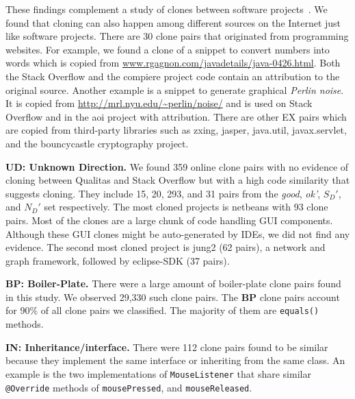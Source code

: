 \documentclass[sigconf,review, anonymous]{acmart}
\begin{document}
These findings complement a study of clones between software
projects~\cite{Svajlenko2014}. We found that cloning can also
happen among different sources on the Internet just like software
projects. There are 30 clone pairs that originated from programming
websites. For example, we found a clone of a snippet to convert
numbers into words which is copied from
\url{www.rgagnon.com/javadetails/java-0426.html}. Both the Stack
Overflow and the \textsf{compiere} project code contain an
attribution to the original source. Another example is a snippet
to generate graphical \textit{Perlin noise}. It is copied from
\url{http://mrl.nyu.edu/~perlin/noise/} and is used on Stack
Overflow and in the \textsf{aoi} project with
attribution.
There are other EX pairs which are copied from third-party
libraries such as \textsf{zxing}, \textsf{jasper}, \textsf{java.util},
\textsf{javax.servlet}, and the \textsf{bouncycastle} cryptography
project.

\textbf{UD: Unknown Direction.} We found 359 online clone pairs with
no evidence of cloning between Qualitas and Stack Overflow but with a
high code similarity that suggests cloning. They include 15, 20, 293,
and 31 pairs from the \textit{good}, \textit{ok'}, $S_D'$, and $N_D'$
set respectively. The most cloned projects is \textsf{netbeans} with
93 clone pairs. Most of the clones are a large chunk of code handling
GUI components. Although these GUI clones might be auto-generated by
IDEs, we did not find any evidence. The second most cloned project is
\textsf{jung2} (62 pairs), a network and graph framework, followed by
\textsf{eclipse-SDK} (37 pairs).

\textbf{BP: Boiler-Plate.} There were a large amount of boiler-plate
clone pairs found in this study. %
We observed 29,330 such clone pairs. The \textbf{BP} clone pairs account for
90\% of all clone pairs we classified. The majority of them are
{\small{\texttt{equals()}}} methods.

\textbf{IN: Inheritance/interface.} There were 112 clone pairs found
to be similar because they implement the same interface or inheriting
from the same class. An example is the two implementations of
{\small{\texttt{MouseListener}}} that share similar
{\small\texttt{@Override}} methods of {\small\texttt{mousePressed}},
and {\small\texttt{mouseReleased}}.
\end{document}
